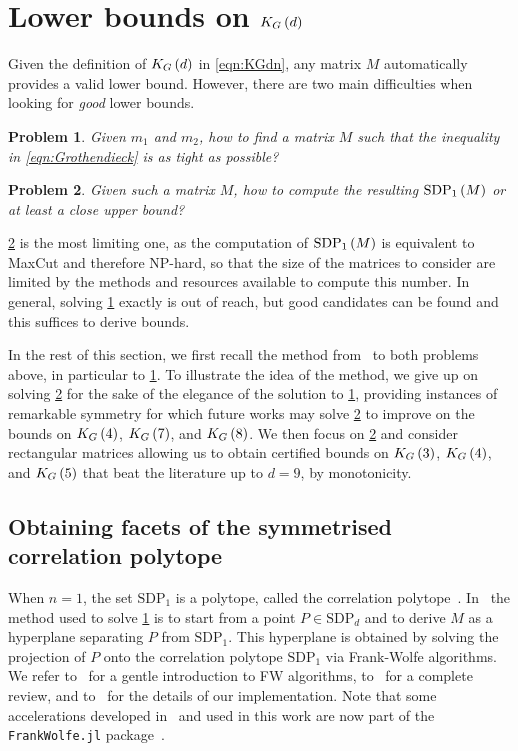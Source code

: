 \documentclass[10pt,aps,notitlepage,onecolumn,pra,superscriptaddress]{revtex4-1}
\newtheorem{problem}{Problem}
\newcommand\cut[2]{\mathrm{SDP}_{#1}^{#2}}
\newcommand\KG[2]{K_G\left({#1}\ifx#2\empty\else\mapsto\fi{#2}\right)}
\newcommand\sdp[2]{\mathrm{SDP}_{#1}\ifx#2\empty\else\left({#2}\right)\fi}
\begin{document}
\section{Lower bounds on \texorpdfstring{$\KG{d}{}$}{KG(d)}}
\label{sec:KGd_low}

Given the definition of $\KG{d}{}$ in \cref{eqn:KGdn}, any matrix $M$ automatically provides a valid lower bound.
However, there are two main difficulties when looking for \emph{good} lower bounds.
\begin{problem}
  Given $m_1$ and $m_2$, how to find a matrix $M$ such that the inequality in \cref{eqn:Grothendieck} is as tight as possible?
  \label{pb:tight}
\end{problem}
\begin{problem}
  Given such a matrix $M$, how to compute the resulting $\sdp{1}{M}$ or at least a close upper bound?
  \label{pb:qubo}
\end{problem}
\cref{pb:qubo} is the most limiting one, as the computation of $\sdp{1}{M}$ is equivalent to MaxCut and therefore NP-hard, so that the size of the matrices to consider are limited by the methods and resources available to compute this number.
In general, solving \cref{pb:tight} exactly is out of reach, but good candidates can be found and this suffices to derive bounds.

In the rest of this section, we first recall the method from~\cite{DIB+23} to both problems above, in particular to \cref{pb:tight}.
To illustrate the idea of the method, we give up on solving \cref{pb:qubo} for the sake of the elegance of the solution to \cref{pb:tight}, providing instances of remarkable symmetry for which future works may solve \cref{pb:qubo} to improve on the bounds on $\KG{4}{}$, $\KG{7}{}$, and $\KG{8}{}$.
We then focus on \cref{pb:qubo} and consider rectangular matrices allowing us to obtain certified bounds on $\KG{3}{}$, $\KG{4}{}$, and $\KG{5}{}$ that beat the literature up to $d=9$, by monotonicity.

\subsection{Obtaining facets of the symmetrised correlation polytope}
\label{sec:fw}

When $n=1$, the set $\cut{1}{}$ is a polytope, called the correlation polytope~\cite{Pit91}.
In~\cite{BNV16,DBV17,DIB+23} the method used to solve \cref{pb:tight} is to start from a point $P\in\cut{d}{}$ and to derive $M$ as a hyperplane separating $P$ from $\cut{1}{}$.
This hyperplane is obtained by solving the projection of $P$ onto the correlation polytope $\cut{1}{}$ via Frank-Wolfe algorithms.
We refer to~\cite{Pok24} for a gentle introduction to FW algorithms, to~\cite{BCC+25} for a complete review, and to~\cite[Appendix~C]{DIB+23} for the details of our implementation.
Note that some accelerations developed in~\cite{DIB+23,DVP24} and used in this work are now part of the \texttt{FrankWolfe.jl} package~\cite{BDH+24}.
\end{document}
